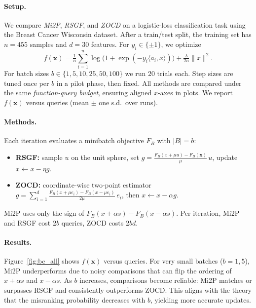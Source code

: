 \documentclass[twoside]{article}
\theoremstyle{plain}
\theoremstyle{definition}
\theoremstyle{remark}
\def\vx{{\bm{x}}}
\begin{document}
\paragraph{Setup.}
We compare \emph{Mi2P}, \emph{RSGF}, and \emph{ZO\text{-}CD} on a logistic-loss
classification task using the Breast Cancer Wisconsin dataset. After a
train/test split, the training set has \(n=455\) samples and \(d=30\) features.
For $y_i\in\{\pm 1\}$, we optimize
\[
f(\vx)=\tfrac{1}{n}\sum_{i=1}^n \log\!\bigl(1+\exp(-y_i\langle a_i,x\rangle)\bigr)
+ \tfrac{\lambda}{2n}\|x\|^2.
\]
For batch sizes \(b\in\{1,5,10,25,50,100\}\) we run 20 trials each. Step sizes
are tuned once per \(b\) in a pilot phase, then fixed. All methods are compared
under the same \emph{function-query budget}, ensuring aligned $x$-axes in plots.
We report \(f(\vx)\) versus queries (mean $\pm$ one s.d.\ over runs).

\paragraph{Methods.}
Each iteration evaluates a minibatch objective \(F_B\) with $|B|=b$:
\begin{itemize}\setlength{\itemsep}{0pt}
\item \textbf{RSGF:} sample $u$ on the unit sphere, set
\(g=\tfrac{F_B(x+\mu u)-F_B(\vx)}{\mu}\,u\), update $x\gets x-\eta g$.
\item \textbf{ZO\text{-}CD:} coordinate-wise two-point estimator
\(g=\sum_{i=1}^d \tfrac{F_B(x+\mu e_i)-F_B(x-\mu e_i)}{2\mu}\,e_i\),
then $x\gets x-\alpha g$.
\end{itemize}
Mi2P uses only the sign of $F_B(x{+}\alpha s)-F_B(x{-}\alpha s)$.
Per iteration, Mi2P and RSGF cost $2b$ queries, ZO\text{-}CD costs $2bd$.

\paragraph{Results.}
Figure~\ref{fig:bc_all} shows $f(\vx)$ versus queries. For very small batches
($b=1,5$), Mi2P underperforms due to noisy comparisons that can flip the
ordering of $x{+}\alpha s$ and $x{-}\alpha s$. As $b$ increases, comparisons
become reliable: Mi2P matches or surpasses RSGF and consistently outperforms
ZO\text{-}CD. This aligns with the theory that the misranking probability
decreases with $b$, yielding more accurate updates.
\end{document}
